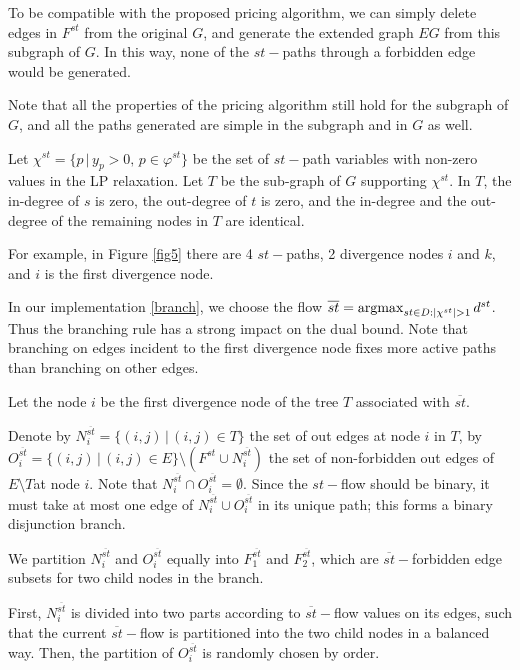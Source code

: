 To be compatible with the proposed pricing algorithm, we can simply delete edges in \(F^{st}\) from the original \(G\), and generate the extended graph \(EG\) from this subgraph of \(G\).
In this way, none of the \(st-\)paths through a forbidden edge would be generated.

Note that all the properties of the pricing algorithm still hold for the subgraph of \(G\), and all the paths generated are simple in the subgraph and in \(G\) as well.

Let \(\chi^{st} = \{p\,|\, y_p > 0,\, p \in \varphi^{st} \}\) be the set of \(st-\)path variables with non-zero values in the LP relaxation. Let $T$ be the sub-graph of $G$ supporting $\chi^{st}$.  In $T$,  the in-degree of \(s\) is zero, the out-degree of $t$ is zero, and the in-degree and the out-degree of the remaining nodes in $T$ are identical. 

For example, in Figure \eqref{fig5} there are 4 \(st-\)paths, 2 divergence nodes \(i\) and \(k\), and \(i\) is the first divergence node.

In our implementation \eqref{branch}, we choose the flow \(\overline{st} = \operatorname{argmax}_{st \in D: |\chi^{st}| > 1} d^{st}\). Thus the branching rule has a strong impact on the dual bound. Note that branching on edges incident to the first divergence node fixes more active paths than branching on other edges.

Let the node $i$ be the first divergence node of the tree \(T\) associated with $\overline{st}$.

Denote by \(N_i^{\overline{st}}=\{(i,j)\,|\,(i,j) \in T\}\) the set of out edges at node \(i\) in \(T\), by \(O_i^{\overline{st}}= \{(i,j) \,|\, (i,j) \in E\}  \setminus (F^{st} \cup N_i^{\overline{st}})\) the set of non-forbidden out edges of \(E \setminus T \)at node \(i\). Note that \(N_i^{\overline{st}} \cap O_i^{\overline{st}} = \emptyset\). Since the \(st-\)flow should be binary, it must take at most one edge of  \(N_i^{\overline{st}} \cup O_i^{\overline{st}}\) in its unique path; this forms a binary disjunction branch.

We partition \(N_i^{\overline{st}}\) and \(O_i^{\overline{st}}\) equally into \(F^{\overline{st}}_1\) and \(F^{\overline{st}}_2\), which are \(\overline{st}-\)forbidden edge subsets for two child nodes in the branch.

First, \(N_i^{\overline{st}}\) is divided into two parts according to \(\overline{st}-\)flow values on its edges, such that the current \(\overline{st}-\)flow is partitioned into the two child nodes in a balanced way. Then, the partition of \(O_i^{\overline{st}}\) is randomly chosen by order.



